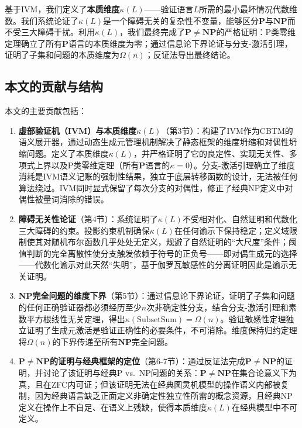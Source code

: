 \documentclass{ctexart}
\begin{document}
	基于IVM，我们定义了\textbf{本质维度$\kappa(L)$}——验证语言$L$所需的最小最坏情况代数维数。我们系统论证了$\kappa(L)$是一个障碍无关的复杂性不变量，能够区分$\mathbf{P}$与$\mathbf{NP}$而不受三大障碍干扰。利用$\kappa(L)$，我们最终完成了$\mathbf{P} \neq \mathbf{NP}$的严格证明：P类零维定理确立了所有$\mathbf{P}$语言的本质维度为零；通过信息论下界论证与分支-激活引理，证明了子集和问题的本质维度为$\Omega(n)$；反证法导出最终结论。
	
	\subsection{本文的贡献与结构}
	
	本文的主要贡献包括：
	
	\begin{enumerate}
		\item \textbf{虚部验证机（IVM）与本质维度$\kappa(L)$}（第3节）：构建了IVM作为CBTM的语义展开器，通过动态生成元管理机制解决了静态框架的维度坍缩和对偶性坍缩问题。定义了本质维度$\kappa(L)$，并严格证明了它的良定性、实现无关性、多项式上界以及P类零维定理（所有$\mathbf{P}$语言的$\kappa=0$）。分支-激活引理确立了维度消耗是IVM语义记账的强制性结果，独立于底层转移函数的设计，无法被任何算法绕过。IVM同时显式保留了每次分支的对偶性，修正了经典NP定义中对偶性被量词消除的错误。
		\item \textbf{障碍无关性论证}（第4节）：系统证明了$\kappa(L)$不受相对化、自然证明和代数化三大障碍的约束。投影约束机制确保$\kappa(L)$在任何谕示下保持稳定；定义域限制使其对随机布尔函数几乎处处无定义，规避了自然证明的``大尺度''条件；阈值判断的完全离散性使分支触发依赖于符号的正负号——即对偶生成元的选择——代数化谕示对此天然``失明''，基于伽罗瓦敏感性的分离证明因此是谕示无关证明。
		\item \textbf{NP完全问题的维度下界}（第5节）：通过信息论下界论证，证明了子集和问题的任何正确验证器都必须经历至少$n$次非确定性分支，结合分支-激活引理和素数平方根线性无关定理，得出$\kappa(\mathrm{SubsetSum}) = \Omega(n)$。验证敏感性定理独立证明了生成元激活是验证正确性的必要条件，不可消除。维度保持归约定理将$\Omega(n)$的下界传递至所有$\mathbf{NP}$完全问题。
		\item \textbf{$\mathbf{P} \neq \mathbf{NP}$的证明与经典框架的定位}（第6-7节）：通过反证法完成$\mathbf{P} \neq \mathbf{NP}$的证明，并讨论了该证明与经典P vs.\ NP问题的关系：$\mathbf{P} \neq \mathbf{NP}$在集合论意义下为真，且在ZFC内可证；但该证明无法在经典图灵机模型的操作语义内部被复制，因为经典语言缺乏正面定义非确定性独立性所需的概念资源，且经典NP定义在操作上不自足、在语义上残缺，使得本质维度$\kappa(L)$在经典模型中不可定义。
	\end{enumerate}
	
\end{document}
